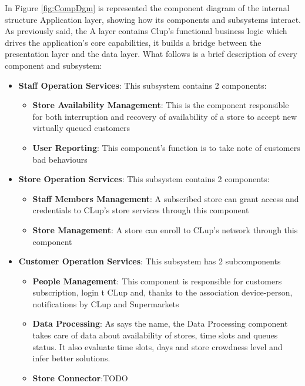 In Figure \ref{fig:CompDgm} is represented the component diagram of the internal structure Application layer, showing how its components and subsystems interact. As previously said, the A layer contains Clup's functional business logic which drives the application’s core capabilities, it builds  a bridge between the presentation layer and the data layer. What follows is a brief description of every component and subsystem:
\begin{itemize}
	\item \textbf{Staff Operation Services}: This subsystem contains 2 components:
	\begin{itemize}
		\item \textbf{Store Availability Management}: This is the component responsible for both interruption and recovery of availability of a store to accept new virtually queued customers
		\item \textbf{User Reporting}: This component's function is to take note of customers bad behaviours 
	\end{itemize} 

	\item \textbf{Store Operation Services}: This subsystem contains 2 components:
	\begin{itemize}
		\item \textbf{Staff Members Management}: A subscribed store can grant access and credentials to CLup's store services through this component 
		\item \textbf{Store Management}: A store can enroll to CLup's network through this component
	\end{itemize} 

	\item \textbf{Customer Operation Services}: This subsystem has 2 subcomponents
	\begin{itemize}
		\item \textbf{People Management}: This component is responsible for customers subscription, login t CLup and, thanks to the association device-person, notifications by CLup and Supermarkets
		\item \textbf{Data Processing}: As says the name, the Data Processing component takes care of data about availability of stores, time slots and queues status. It also evaluate time slots, days and store crowdness level and infer better solutions.
		\item \textbf{Store Connector}:TODO
	\end{itemize}


\end{itemize}
